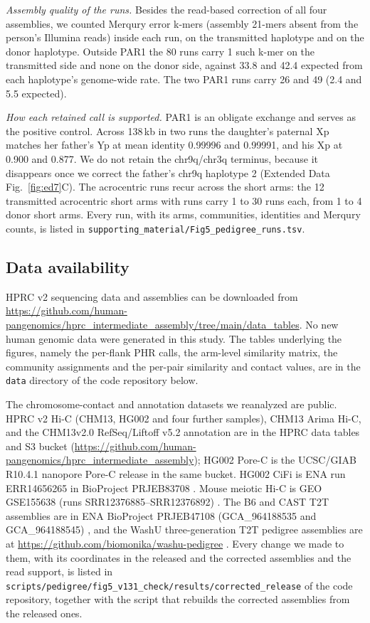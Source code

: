 \documentclass[pdflatex,mathphys]{jnl}
\begin{document}
\emph{Assembly quality of the runs.} Besides the read-based correction of all four assemblies, we
counted Merqury error k-mers (assembly 21-mers absent from the person's Illumina reads) inside each
run, on the transmitted haplotype and on the donor haplotype. Outside PAR1 the 80 runs carry 1 such
k-mer on the transmitted side and none on the donor side, against 33.8 and 42.4 expected from each
haplotype's genome-wide rate. The two PAR1 runs carry 26 and 49 (2.4 and 5.5 expected).

\emph{How each retained call is supported.} PAR1 is an obligate exchange and serves as the positive
control. Across 138\,kb in two runs the daughter's paternal Xp matches her father's Yp at mean identity
0.99996 and 0.99991, and his Xp at 0.900 and 0.877. We do not retain the chr9q/chr3q terminus, because
it disappears once we correct the father's chr9q haplotype 2 (Extended Data Fig.~\ref{fig:ed7}C). The
acrocentric runs recur across the short arms: the 12 transmitted acrocentric short arms with runs carry
1 to 30 runs each, from 1 to 4 donor short arms. Every run, with its arms, communities, identities and
Merqury counts, is listed in \texttt{supporting\_material/Fig5\_pedigree\_runs.tsv}.

\subsection*{Data availability}

HPRC v2 sequencing data and assemblies can be downloaded from
\url{https://github.com/human-pangenomics/hprc_intermediate_assembly/tree/main/data_tables}.
No new human genomic data were generated in this study. The tables underlying the figures, namely the
per-flank PHR calls, the arm-level similarity matrix, the community assignments and the per-pair
similarity and contact values, are in the \texttt{data} directory of the code repository below.

The chromosome-contact and annotation datasets we reanalyzed are public. HPRC v2
Hi-C (CHM13, HG002 and four further samples), CHM13 Arima Hi-C, and the
CHM13v2.0 RefSeq/Liftoff v5.2 annotation are in the HPRC data tables and S3
bucket (\url{https://github.com/human-pangenomics/hprc_intermediate_assembly});
HG002 Pore-C is the UCSC/GIAB R10.4.1 nanopore Pore-C release in the same
bucket. HG002 CiFi is ENA run ERR14656265 in BioProject PRJEB83708 \cite{hic3d_cifi2025}. Mouse
meiotic Hi-C is GEO GSE155638 (runs SRR12376885--SRR12376892) \cite{Zuo2021}.
The B6 and CAST T2T assemblies are in ENA BioProject PRJEB47108 (GCA\_964188535
and GCA\_964188545) \cite{Francis2025}, and the WashU three-generation T2T
pedigree assemblies are at \url{https://github.com/biomonika/washu-pedigree}
\cite{Cechova2025}. Every change we made to
them, with its coordinates in the released and the corrected assemblies and the read support, is listed in
\texttt{scripts/pedigree/fig5\_v131\_check/results/corrected\_release} of the code repository, together with
the script that rebuilds the corrected assemblies from the released ones.
\end{document}
